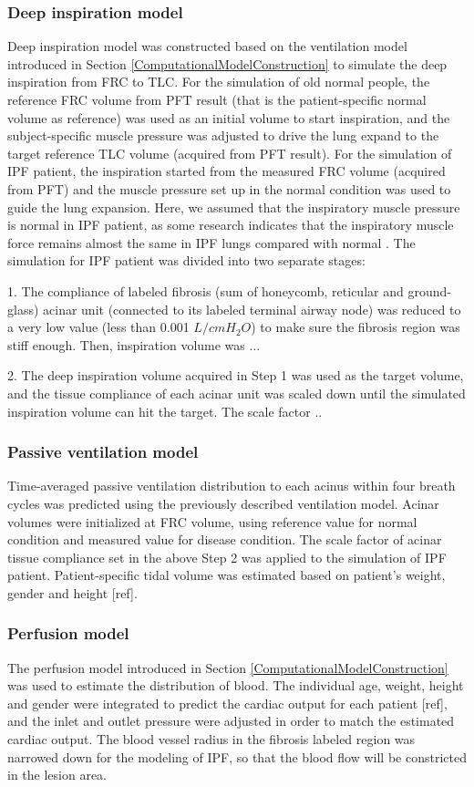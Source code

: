 \subsubsection{Deep inspiration model} 
Deep inspiration model was constructed based on the ventilation model introduced in Section \ref{ComputationalModelConstruction} to simulate the deep inspiration from FRC to TLC. For the simulation of old normal people, the reference FRC volume from PFT result (that is the patient-specific normal volume as reference) was used as an initial volume to start inspiration, and the subject-specific muscle pressure was adjusted to drive the lung expand to the target reference TLC volume (acquired from PFT result). For the simulation of IPF patient, the inspiration started from the measured FRC volume (acquired from PFT) and the muscle pressure set up in the normal condition was used to guide the lung expansion. Here, we assumed that the inspiratory muscle pressure is normal in IPF patient, as some research indicates that the inspiratory muscle force remains almost the same in IPF lungs compared with normal \citep{de1980inspiratory}. The simulation for IPF patient was divided into two separate stages:

1. The compliance of labeled fibrosis (sum of honeycomb, reticular and ground-glass) acinar unit (connected to its labeled terminal airway node) was reduced to a very low value (less than 0.001 $L/cmH_2O$) to make sure the fibrosis region was stiff enough. Then, inspiration volume was ...

2. The deep inspiration volume acquired in Step 1 was used as the target volume, and the tissue compliance of each acinar unit was scaled down until the simulated inspiration volume can hit the target. The scale factor ..

\subsubsection{Passive ventilation model}
Time-averaged passive ventilation distribution to each acinus within four breath cycles was predicted using the previously described ventilation model. Acinar volumes were initialized at FRC volume, using reference value for normal condition and measured value for disease condition. The scale factor of acinar tissue compliance set in the above Step 2 was applied to the simulation of IPF patient. Patient-specific tidal volume was estimated based on patient's weight, gender and height [ref].

\subsubsection{Perfusion model}
The perfusion model introduced in Section \ref{ComputationalModelConstruction} was used to estimate the distribution of blood. The individual age, weight, height and gender were integrated to predict the cardiac output for each patient [ref], and the inlet and outlet pressure were adjusted in order to match the estimated cardiac output. The blood vessel radius in the fibrosis labeled region was narrowed down for the modeling of IPF, so that the blood flow will be constricted in the lesion area.


